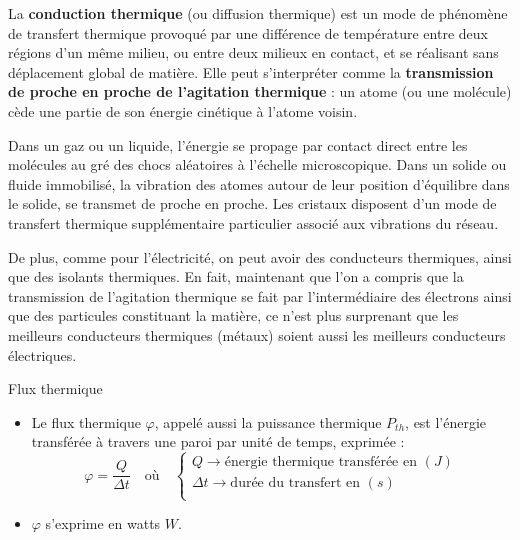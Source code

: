 \documentclass[11pt,a4paper]{article}
\begin{document}
La \textbf{conduction thermique} (ou diffusion thermique) est un mode de phénomène de transfert thermique provoqué par une différence de température entre deux régions d'un même milieu, ou entre deux milieux en contact, et se réalisant sans déplacement global de matière. Elle peut s'interpréter comme la \textbf{transmission de proche en proche de l'agitation thermique} : un atome (ou une molécule) cède une partie de son énergie cinétique à l'atome voisin.

Dans un gaz ou un liquide, l'énergie se propage par contact direct entre les molécules au gré des chocs aléatoires à l'échelle microscopique. Dans un solide ou fluide immobilisé, la vibration des atomes autour de leur position d'équilibre dans le solide, se transmet de proche en proche. Les cristaux disposent d'un mode de transfert thermique supplémentaire particulier associé aux vibrations du réseau.

De plus, comme pour l’électricité, on peut avoir des conducteurs thermiques, ainsi que des isolants thermiques.  En fait, maintenant que l’on a compris que la transmission de l’agitation thermique se fait par l’intermédiaire des électrons ainsi que des particules constituant la matière, ce n’est plus surprenant que les meilleurs conducteurs thermiques (métaux)  soient aussi les meilleurs conducteurs électriques. 

\begin{defn}{Flux thermique}
\begin{itemize}
    \item Le flux thermique $\varphi$, appelé aussi la puissance thermique $P_{th}$, est l’énergie transférée à travers une paroi par unité de temps, exprimée : 
\[ \varphi = \dfrac{Q}{\Delta t}   \quad \text{où} \quad
\begin{cases}
    Q \rightarrow \text{énergie thermique transférée en }(J) \\
    \Delta t \rightarrow \text{durée du transfert en }(s) \\ 
\end{cases}
\]
    \item $\varphi$ s’exprime en watts $W$.
\end{itemize}
\end{defn}
\end{document}
